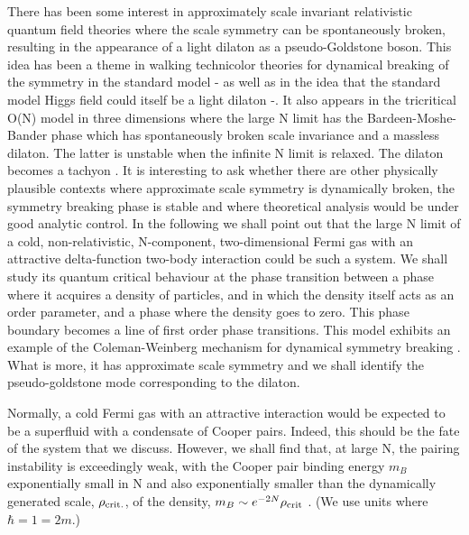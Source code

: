 \documentclass[twocolumn,secnumarabic,amssymb, nobibnotes, aps, prd]{revtex4}
\begin{document}
 
 There has been some interest in approximately scale invariant relativistic quantum field theories where the scale symmetry
 can be spontaneously broken, resulting in the appearance of a light dilaton as a pseudo-Goldstone boson.  This idea has been a theme in
 walking technicolor theories for dynamical breaking of the symmetry in the standard model  \cite{Appelquist:2010gy}-\cite{Hashimoto:2010nw} as
  well as in the idea that the standard model Higgs field could itself be a light dilaton \cite{Goldberger:2008zz}-\cite{Grinstein:2011dq}.
 It also appears in the tricritical O(N) model  in three dimensions  where the large N limit has the Bardeen-Moshe-Bander 
 phase \cite{Bardeen:1983rv} which has spontaneously broken scale invariance and a massless dilaton. The latter  
is unstable when the infinite N limit is relaxed. The dilaton becomes a tachyon \cite{Omid:2016jve}.  
 It is interesting to ask whether there are other physically plausible contexts where approximate scale symmetry
 is dynamically broken, the symmetry breaking phase is stable 
 and where  theoretical analysis would be under good analytic control.  
 In the following we shall point out that the large N limit of a cold, non-relativistic, 
 N-component, two-dimensional Fermi gas with an
 attractive delta-function two-body interaction could
 be such a system. We shall study its quantum critical behaviour 
at the phase transition between a phase where it acquires a density of particles, and in which the density itself acts as an order parameter,
 and a phase where the density goes to zero.  This phase boundary becomes a line of
 first order phase transitions. This model exhibits an example of the Coleman-Weinberg
 mechanism for dynamical symmetry breaking \cite{Coleman}. What is more, it has
approximate scale symmetry and we shall identify the pseudo-goldstone mode corresponding to the dilaton. 

 Normally, a cold  Fermi gas with an attractive interaction would
 be expected to be a superfluid with a condensate of Cooper pairs.  Indeed, this should be
 the fate of the  system that we discuss.  However, we shall find that, at large N,  the pairing instability is exceedingly weak, with
 the Cooper pair binding energy $m_B$ exponentially small in N and also exponentially smaller than the 
 dynamically generated scale, $\rho_{\rm crit.}$, of the density, $m_B\sim e^{-2 N}\rho_{\rm crit}$ \cite{largeN}. 
(We use units  where $\hbar=1=2m$.)
  
\end{document}
